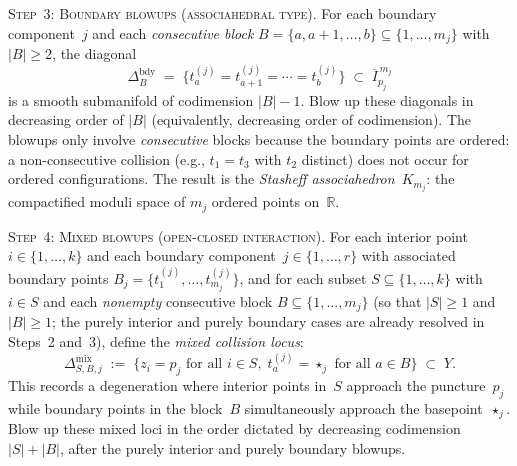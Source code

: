 \begin{construction}
\medskip
\noindent\textsc{Step~3: Boundary blowups (associahedral type).}
For each boundary component~$j$ and each \emph{consecutive
block} $B = \{a, a{+}1, \ldots, b\} \subseteq
\{1, \ldots, m_j\}$ with $|B| \geq 2$,
the diagonal
\begin{equation}\label{eq:consecutive-diagonal}
\Delta_B^{\mathrm{bdy}}
\;=\;
\bigl\{t_a^{(j)} = t_{a+1}^{(j)} = \cdots = t_b^{(j)}\bigr\}
\;\subset\;
\overline{I}_{p_j}^{\,m_j}
\end{equation}
is a smooth submanifold of codimension $|B| - 1$. Blow up these
diagonals in decreasing order of $|B|$
(equivalently, decreasing order of codimension).
The blowups only involve \emph{consecutive} blocks because the
boundary points are ordered: a non-consecutive collision (e.g.,
$t_1 = t_3$ with $t_2$ distinct) does not occur for ordered
configurations. The result is the
\emph{Stasheff associahedron}~$K_{m_j}$: the compactified moduli
space of $m_j$ ordered points on~$\mathbb{R}$.

\medskip
\noindent\textsc{Step~4: Mixed blowups (open-closed interaction).}
For each interior point $i \in \{1, \ldots, k\}$ and each
boundary component~$j \in \{1, \ldots, r\}$ with associated
boundary points $B_j = \{t_1^{(j)}, \ldots, t_{m_j}^{(j)}\}$,
and for each subset $S \subseteq \{1, \ldots, k\}$ with
$i \in S$ and each \emph{nonempty} consecutive block
$B \subseteq \{1, \ldots, m_j\}$ (so that $|S| \geq 1$
and $|B| \geq 1$; the purely interior and purely boundary
cases are already resolved in Steps~2 and~3), define the
\emph{mixed collision locus}:
\begin{equation}\label{eq:mixed-collision}
\Delta_{S, B, j}^{\mathrm{mix}}
\;:=\;
\bigl\{
z_i = p_j \text{ for all } i \in S,\;
t_a^{(j)} = \star_j \text{ for all } a \in B
\bigr\}
\;\subset\; Y.
\end{equation}
This records a degeneration where interior points in~$S$
approach the puncture~$p_j$ while boundary points in the
block~$B$ simultaneously approach the basepoint~$\star_j$.
Blow up these mixed loci in the order dictated by decreasing
codimension $|S| + |B|$, after the purely interior and
purely boundary blowups.


\end{construction}
